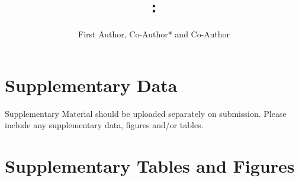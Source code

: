 \documentclass{frontiers_suppmat} %
\def\firstAuthorLast{Frontiers}
\def\Authors{First Author, Co-Author* and Co-Author}
\begin{document}
\onecolumn
{}

\title[Supplementary Material]{{}:
\\ } %

\author[\firstAuthorLast ]{\Authors} %
\correspondance{} %

\extraAuth{}%

\maketitle


\section{Supplementary Data}

Supplementary Material should be uploaded separately on submission. Please include any supplementary data, figures and/or tables. 

\section{Supplementary Tables and Figures}
\end{document}
